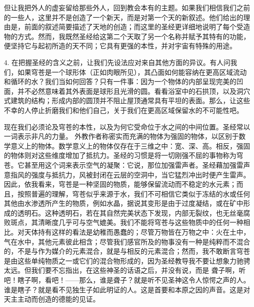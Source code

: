 但让我把外人的虚妄留给那些外人，回到教会本有的主题。如果我们相信我们之前的一些人，这里并不是创造了一个新天，而是对第一个天的新叙述。他们给出的理由是，前面的叙述简要描述了天地的创造；而这里的圣经更详细地说明了每个受造物的方式。然而，我既然圣经给这第二个天取了另一个名称并赋予其特有的功能，便坚持它与起初所造的天不同；它具有更强的本性，并对宇宙有特殊的用途。\par

4.   在把握圣经的含义之前，让我们先设法应对来自其他方面的异议。有人问我们，如果穹苍是一个球形体（正如肉眼所见），其凸面如何能容纳在更高区域流动和循环的水？我们当如何回答？只有一件事：因为一个物体的内部呈现完美的凹面，并不必然意味着其外表面是球形且光滑的圆。看看浴室中的石拱顶，以及洞穴式建筑的结构；形成内部的圆顶并不阻止屋顶通常具有平坦的表面。那么，让这些不幸的人停止折磨我们和他们自己，关于我们在更高区域保留水的不可能性吧。\par

现在我们必须论及穹苍的本性，以及为何它受命位于水之间的中间位置。圣经常以一词表示非凡的力量。   外教作者称密实而充满的物体为强固的物体，以区别于数学意义上的物体。数学意义上的物体仅存在于三维之中：宽、深、高。相反，强固的物体则对这些维度增加了抵抗力。圣经的习惯是将一切刚强不屈的事物称为穹苍。它甚至用这个词来表示空气的凝聚：它说，那位加强雷声者。圣经藉加强雷声意指风的强度与抵抗力，风被封闭在云层的空洞中，当它猛烈冲出时便产生雷声。因此，依我看来，穹苍是一种坚固的物质，能够保留流动而不稳定的水元素；而且，按照普遍的理解，穹苍似乎来源于水，我们不可相信它类似于冻结的水或任何其他由水渗透所产生的物质，例如水晶，据说其变形是由于过度凝结，或在矿中形成的透明石。这种透明石，若在其自然完美状态下发现，内部无裂纹，也无丝毫腐败斑点，其清晰度几乎可与空气媲美。我们不能将穹苍与这些物质中的任何一种相比。对天体持有这样的看法是幼稚而愚蠢的；尽管万物皆在万物之中：火在土中，气在水中，其他元素彼此相含；尽管我们感官所及的物事没有一种是纯粹而不混合的，不是与作为媒介的元素混合，就是与相反的元素混合；然而，我不敢断言穹苍是由这些单纯物质之一或它们的混合物形成的，因为圣经教导我不要让想象力驰骋太远。但我们要不忘指出，在这些神圣的话语之后，并没有说，而是  聋子啊，听吧！瞎子啊，看吧！——那么，谁是聋子？就是听不见圣神这令人惊愕之声的人。谁是瞎子？就是看不见独生子如此明证的人。这是首要和本原之因的声音。这是对天主主动而创造的德能的见证。\par

